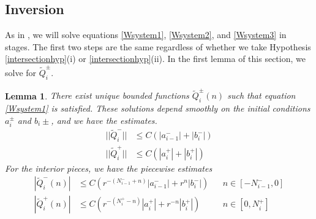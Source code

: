 \documentclass[12pt]{article}
\newtheorem{lemma}{Lemma}
\begin{document}
\subsection{Inversion}

As in \cite{Sandstede1997}, we will solve equations \eqref{Wsystem1}, \eqref{Wsystem2}, and \eqref{Wsystem3} in stages. The first two steps are the same regardless of whether we take Hypothesis \ref{intersectionhyp}(i) or \ref{intersectionhyp}(ii). In the first lemma of this section, we solve for $\tilde{Q}_i^\pm$. 

\begin{lemma}\label{inv1}
There exist unique bounded functions $\tilde{Q}_i^\pm(n)$ such that equation \eqref{Wsystem1} is satisfied. These solutions depend smoothly on the initial conditions $a_i^\pm$ and $b_i\pm$, and we have the estimates.
\begin{equation}\label{Wipmest}
\begin{aligned}
||\tilde{Q}_i^-|| &\leq C (|a_{i-1}^-| + |b_i^-|) \\
||\tilde{Q}_i^+|| &\leq C (|a_i^+| + |b_i^+| )
\end{aligned}
\end{equation}
For the interior pieces, we have the piecewise estimates
\begin{equation}\label{Wipiecewise}
\begin{aligned}
|\tilde{Q}_i^-(n)| &\leq C (r^{-(N_{i-1}^- + n)}|a_{i-1}^-| + r^n|b_i^-|) && n \in [-N_{i-1}^-, 0] \\
|\tilde{Q}_i^+(n)| &\leq C (r^{-(N_i^+ - n)}|a_i^+| + r^{-n}|b_i^+| ) && n \in [0, N_i^+] 
\end{aligned}
\end{equation}


\end{lemma}
\end{document}
